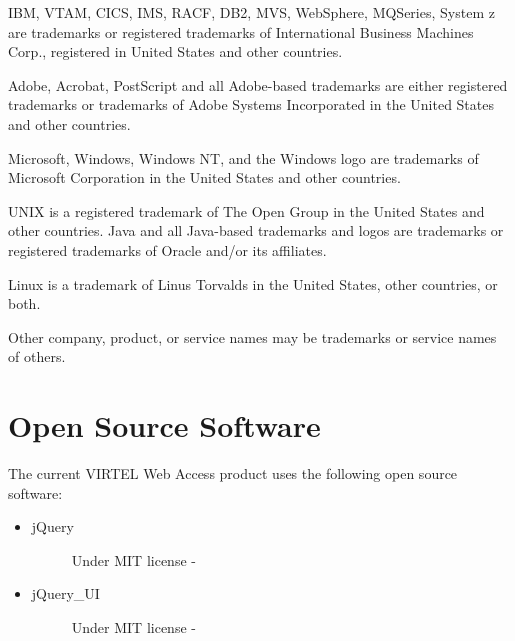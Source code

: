 \documentclass[letterpaper,10pt,english]{sphinxmanual}
\begin{document}
IBM, VTAM, CICS, IMS, RACF, DB2, MVS, WebSphere, MQSeries, System z are trademarks or registered trademarks of International Business Machines Corp., registered in United States and other countries.

Adobe, Acrobat, PostScript and all Adobe-based trademarks are either registered trademarks or trademarks of Adobe Systems Incorporated in the United States and other countries.

Microsoft, Windows, Windows NT, and the Windows logo are trademarks of Microsoft Corporation in the United States and other countries.

UNIX is a registered trademark of The Open Group in the United States and other countries. Java and all Java-based trademarks and logos are trademarks or registered trademarks of Oracle and/or its affiliates.

Linux is a trademark of Linus Torvalds in the United States, other countries, or both.

Other company, product, or service names may be trademarks or service names of others.


\section{Open Source Software}
\label{\detokenize{audit_operations_ and_performance:open-source-software}}
The current VIRTEL Web Access product uses the following open source software:
\begin{itemize}
\item {} \begin{description}
\item[{jQuery}] \leavevmode
Under MIT license - 

\end{description}

\item {} \begin{description}
\item[{jQuery\_UI}] \leavevmode
Under MIT license - 

\end{description}

\end{itemize}



\renewcommand{\indexname}{Index}
\printindex
\end{document}
